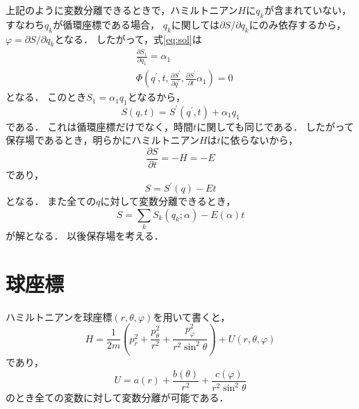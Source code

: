 \documentclass[a4paper,12pt]{jsarticle}
\newcommand{\pdif}[2]{\frac{\partial #1}{\partial #2}}
\begin{document}
	上記のように変数分離できるときで，ハミルトニアン$H$に$q_k$が含まれていない，
	すなわち$q_k$が循環座標である場合，
	$q_k$に関しては$\partial S / \partial q_k$にのみ依存するから，
	$\varphi = \partial S / \partial q_k$となる．
	したがって，式\eqref{eq:sol}は
	\begin{align}
	&\pdif{S_1}{q_1} = \alpha_1 \\
	&\Phi \left( q^{\prime}, t, \pdif{S^{\prime}}{q^{\prime}},
	\pdif{S^{\prime}}{t} \alpha_1 \right) = 0
	\end{align}
	となる．
	このとき$S_1 = \alpha_1 q_1$となるから，
	\begin{equation}
	S(q, t) = S^{\prime} (q^{\prime}, t) + \alpha_1 q_1
	\end{equation}
	である．
	これは循環座標だけでなく，時間$t$に関しても同じである．
	したがって保存場であるとき，明らかにハミルトニアン$H$は$t$に依らないから，
	\begin{equation}
	\pdif{S}{t} = -H = -E
	\end{equation}
	であり，
	\begin{equation}
	S = S^{\prime}(q) - Et
	\end{equation}
	となる．
	また全ての$q$に対して変数分離できるとき，
	\begin{equation}
	S = \sum_k S_{k} \left( q_k; \alpha \right) - E \left( \alpha \right)t
	\end{equation}
	が解となる．
	以後保存場を考える．
	
	\section{球座標}
	ハミルトニアンを球座標$(r, \theta, \varphi)$を用いて書くと，
	\begin{equation}
	H = \frac{1}{2m} \left( p_r^2 + \frac{p_{\theta}^2}{r^2}
	+ \frac{p_{\varphi}^2}{r^2 \sin^2 \theta} \right) + U(r, \theta, \varphi)
	\end{equation}
	であり，
	\begin{equation}
	U = a(r) + \frac{b(\theta)}{r^2} + \frac{c(\varphi)}{r^2 \sin^2 \theta}
	\end{equation}
	のとき全ての変数に対して変数分離が可能である．
	
\end{document}

